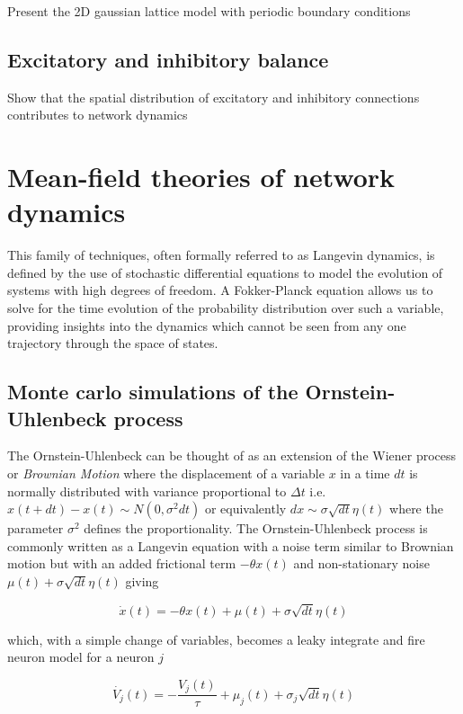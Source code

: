 \documentclass{ucetd}
\begin{document}
Present the 2D gaussian lattice model with periodic boundary conditions

\section{Excitatory and inhibitory balance}

Show that the spatial distribution of excitatory and inhibitory connections contributes to network dynamics

\chapter{Mean-field theories of network dynamics}

This family of techniques, often formally referred to as Langevin dynamics, is defined by the use of stochastic differential equations to model the evolution of systems with high degrees of freedom. A Fokker-Planck equation allows us to solve for the time evolution of the probability distribution over such a variable, providing insights into the dynamics which cannot be seen from any one trajectory through the space of states. 


\section{Monte carlo simulations of the Ornstein-Uhlenbeck process}

The Ornstein-Uhlenbeck can be thought of as an extension of the Wiener process or \emph{Brownian Motion} where the displacement of a variable $x$ in a time $dt$ is normally distributed with variance proportional to $\Delta t$ i.e. $x(t+dt) - x(t) \sim N(0, \sigma^{2}dt)$ or equivalently $dx \sim \sigma\sqrt{dt}\eta(t)$ where the parameter $\sigma^{2}$ defines the proportionality. The Ornstein-Uhlenbeck process is commonly written as a Langevin equation with a noise term similar to Brownian motion but with an added frictional term $-\theta x(t)$ and non-stationary noise $\mu(t) + \sigma\sqrt{dt}\eta(t)$ giving

\begin{equation*}
\dot{x}(t) = -\theta x(t) + \mu(t) + \sigma\sqrt{dt}\eta(t)
\end{equation*}

which, with a simple change of variables, becomes a leaky integrate and fire neuron model for a neuron $j$

\begin{equation*}
\dot{V_{j}}(t) = -\frac{V_{j}(t)}{\tau} + \mu_{j}(t) + \sigma_{j}\sqrt{dt}\eta(t)
\end{equation*}
\end{document}
